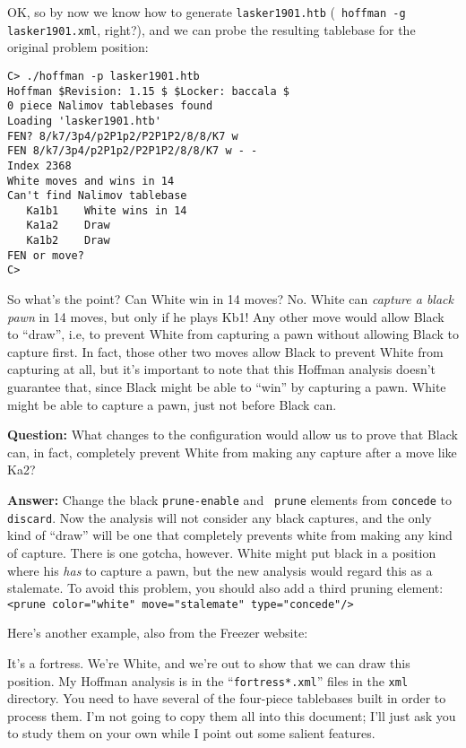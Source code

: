 \documentclass[11pt]{article}
\begin{document}
OK, so by now we know how to generate {\tt lasker1901.htb} ({\tt
hoffman -g lasker1901.xml}, right?), and we can probe the resulting
tablebase for the original problem position:

\begin{verbatim}
C> ./hoffman -p lasker1901.htb
Hoffman $Revision: 1.15 $ $Locker: baccala $
0 piece Nalimov tablebases found
Loading 'lasker1901.htb'
FEN? 8/k7/3p4/p2P1p2/P2P1P2/8/8/K7 w
FEN 8/k7/3p4/p2P1p2/P2P1P2/8/8/K7 w - -
Index 2368
White moves and wins in 14
Can't find Nalimov tablebase
   Ka1b1    White wins in 14
   Ka1a2    Draw
   Ka1b2    Draw
FEN or move?
C>
\end{verbatim}

So what's the point?  Can White win in 14 moves?  No.  White can {\it
capture a black pawn} in 14 moves, but only if he plays Kb1!  Any
other move would allow Black to ``draw'', i.e, to prevent White from
capturing a pawn without allowing Black to capture first.  In fact,
those other two moves allow Black to prevent White from capturing at
all, but it's important to note that this Hoffman analysis doesn't
guarantee that, since Black might be able to ``win'' by capturing a
pawn.  White might be able to capture a pawn, just not before Black
can.

{\bf Question:} What changes to the configuration would allow us to
prove that Black can, in fact, completely prevent White from making
any capture after a move like Ka2?

{\bf Answer:} Change the black {\tt prune-enable} and {\tt
prune} elements from {\tt concede} to {\tt discard}.  Now the analysis
will not consider any black captures, and the only kind of ``draw''
will be one that completely prevents white from making any kind of
capture.  There is one gotcha, however.  White might put black in a
position where his {\it has} to capture a pawn, but the new analysis
would regard this as a stalemate.  To avoid this problem, you should
also add a third pruning element: {\tt <prune color="white"
move="stalemate" type="concede"/>}

Here's another example, also from the Freezer website:

\showboard

It's a fortress.  We're White, and we're out to show that we can draw
this position.  My Hoffman analysis is in the ``{\tt fortress*.xml}''
files in the {\tt xml} directory.  You need to have several of
the four-piece tablebases built in order to process them.  I'm not
going to copy them all into this document; I'll just ask you to study
them on your own while I point out some salient features.
\end{document}
